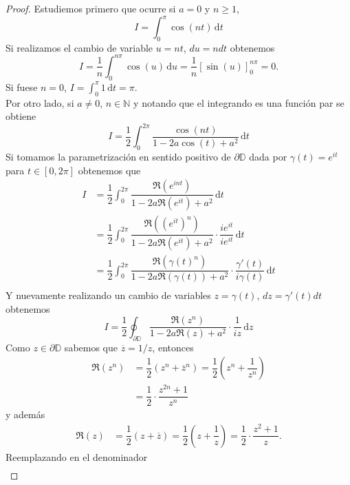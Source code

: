 \documentclass{article}
\newcommand{\D}{\mathbb{D}}
\newcommand{\N}{\mathbb{N}}
\begin{document}
\begin{proof}
    Estudiemos primero que ocurre si \( a = 0 \) y \( n \geq 1 \), \[
        I = \int_0^{\pi} \cos(nt) \, \mathrm{d}t
    \]
    Si realizamos el cambio de variable \( u = nt \), \( du = n dt \) obtenemos \[
        I = \frac{1}{n} \int_0^{n \pi} \cos(u) \, \mathrm{d}u = \frac{1}{n} {\left[ \sin(u) \right]}_0^{n\pi} = 0.
    \]
    Si fuese \( n = 0 \), \( I = \int_0^{\pi} 1 \, \mathrm{d}t = \pi \). \\
    Por otro lado, si \( a \neq 0 \), \( n \in \N \) y notando que el integrando es una función par se obtiene \[
        I = \dfrac{1}{2} \int_0^{2\pi} \dfrac{\cos(nt)}{1 - 2a \cos(t) + a^2} \, \mathrm{d}t
    \]
    Si tomamos la parametrización en sentido positivo de \( \partial \D \) dada por \( \gamma(t) = e^{it} \) para \( t \in [0, 2\pi] \) obtenemos que \begin{align*}
        I & = \dfrac{1}{2} \int_0^{2\pi} \dfrac{\Re\left(e^{int}\right)}{1 - 2a \Re\left(e^{it}\right) + a^2} \, \mathrm{d}t                                                  \\
          & = \dfrac{1}{2} \int_0^{2\pi} \dfrac{\Re\left({({e^{it}})}^n\right)}{1 - 2a \Re\left(e^{it}\right) + a^2} \cdot \dfrac{i e^{it}}{i e^{it}} \, \mathrm{d}t          \\
          & = \dfrac{1}{2} \int_0^{2\pi} \dfrac{\Re\left({{\gamma(t)}^n}\right)}{1 - 2a \Re\left(\gamma(t)\right) + a^2} \cdot \dfrac{\gamma'(t)}{i \gamma(t)} \, \mathrm{d}t \\
    \end{align*}
    Y nuevamente realizando un cambio de variables \( z = \gamma(t) \), \( dz = \gamma'(t) dt \) obtenemos \[
        I = \dfrac{1}{2} \oint_{\partial \D} \dfrac{\Re\left( z^n \right)}{1 - 2a \Re(z) + a^2} \cdot \dfrac{1}{i z} \, \mathrm{d}z
    \]
    Como \( z \in \partial \D \) sabemos que \( \overline{z} = 1/z \), entonces \begin{align*}
        \Re(z^n) & = \dfrac{1}{2} (z^n + \overline{z}^n) = \dfrac{1}{2} \left( z^n + \dfrac{1}{z^n} \right) \\
                 & = \dfrac{1}{2} \cdot \dfrac{z^{2n} + 1}{z^n}
    \end{align*}
    y además \begin{align*}
        \Re(z) & = \dfrac{1}{2} (z + \overline{z}) = \dfrac{1}{2} \left( z + \dfrac{1}{z} \right) = \dfrac{1}{2} \cdot \dfrac{z^2 + 1}{z}.
    \end{align*}
    Reemplazando en el denominador \begin{align*}

\end{align*}
\end{proof}
\end{document}
